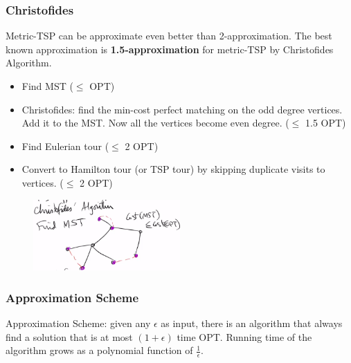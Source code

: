 \subsubsection{Christofides}
Metric-TSP can be approximate even better than 2-approximation. The best known approximation is \textbf{1.5-approximation} for metric-TSP by Christofides Algorithm. 
\begin{itemize}
	\item Find MST ($\le$ OPT)
	\item Christofides: find the min-cost perfect matching on the odd degree vertices. Add it to the MST. Now all the vertices become even degree. ($\le$ 1.5 OPT)
	\item Find Eulerian tour ($\le$ 2 OPT)
	\item Convert to Hamilton tour (or TSP tour) by skipping duplicate visits to vertices. ($\le$ 2 OPT)
\end{itemize}

\begin{figure}[H]
	\centering
	\includegraphics[width=0.5\textwidth]{fig/christofides.png}
\end{figure}
\subsubsection{Approximation Scheme}
Approximation Scheme: given any $\epsilon$ as input, there is an algorithm that always find a solution that is at most $(1 + \epsilon)$ time OPT. Running time of the algorithm grows as a polynomial function of $\frac{1}{\epsilon}$.




















